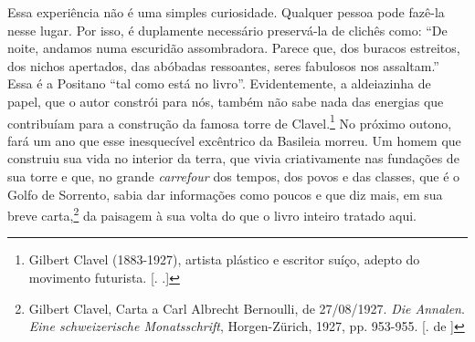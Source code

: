Essa experiência não é uma simples curiosidade. Qualquer pessoa pode
fazê-la nesse lugar. Por isso, é duplamente necessário preservá-la de
clichês como: ``De noite, andamos numa escuridão assombradora. Parece
que, dos buracos estreitos, dos nichos apertados, das abóbadas
ressoantes, seres fabulosos nos assaltam.'' Essa é a Positano ``tal como
está no livro''. Evidentemente, a aldeiazinha de papel, que o autor
constrói para nós, também não sabe nada das energias que contribuíam
para a construção da famosa torre de Clavel.\footnote{Gilbert Clavel
  (1883-1927), artista plástico e escritor suíço, adepto do movimento
  futurista. [. .]} No próximo outono, fará um ano que esse
inesquecível excêntrico da Basileia morreu. Um homem que construiu sua
vida no interior da terra, que vivia criativamente nas fundações de sua
torre e que, no grande \emph{carrefour} dos tempos, dos povos e das
classes, que é o Golfo de Sorrento, sabia dar informações como poucos e
que diz mais, em sua breve carta,\footnote{Gilbert Clavel, Carta a Carl
  Albrecht Bernoulli, de 27/08/1927. \emph{Die Annalen}. \emph{Eine
  schweizerische Monatsschrift}, Horgen-Zürich, 1927, pp. 953-955. [.
  de ]} da paisagem à sua volta do que o livro inteiro tratado
aqui.

